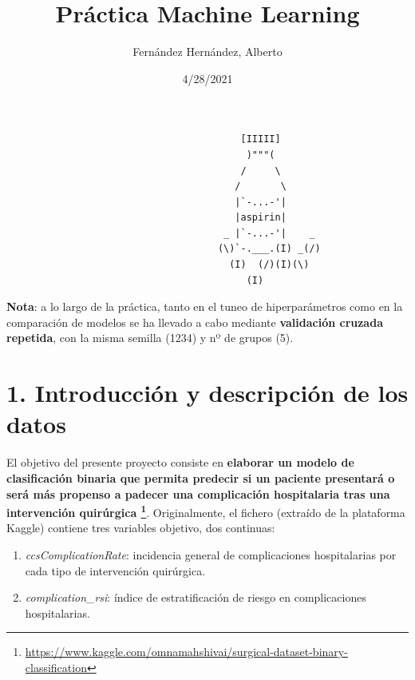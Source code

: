 \documentclass[
]{article}
\title{Práctica Machine Learning}
\author{Fernández Hernández, Alberto}
\date{4/28/2021}
\providecommand{\tightlist}{%
  \setlength{\itemsep}{0pt}\setlength{\parskip}{0pt}}
\begin{document}
\maketitle

\justify

\begin{verbatim}
                                         [IIIII]
                                          )"""(
                                         /     \
                                        /       \
                                        |`-...-'|
                                        |aspirin|
                                      _ |`-...-'|    _
                                     (\)`-.___.(I) _(/)
                                       (I)  (/)(I)(\)
                                          (I)        
\end{verbatim}

\textbf{Nota}: a lo largo de la práctica, tanto en el tuneo de
hiperparámetros como en la comparación de modelos se ha llevado a cabo
mediante \textbf{validación cruzada repetida}, con la misma semilla
(1234) y nº de grupos (5).

\newpage

\hypertarget{introducciuxf3n-y-descripciuxf3n-de-los-datos}{%
\section{1. Introducción y descripción de los
datos}\label{introducciuxf3n-y-descripciuxf3n-de-los-datos}}

El objetivo del presente proyecto consiste en \textbf{elaborar un modelo
de clasificación binaria que permita predecir si un paciente presentará
o será más propenso a padecer una complicación hospitalaria tras una
intervención quirúrgica \footnote{\url{https://www.kaggle.com/omnamahshivai/surgical-dataset-binary-classification}}}.
Originalmente, el fichero (extraído de la plataforma Kaggle) contiene
tres variables objetivo, dos continuas:

\begin{enumerate}
\def\labelenumi{\arabic{enumi}.}
\tightlist
\item
  \emph{ccsComplicationRate}: incidencia general de complicaciones
  hospitalarias por cada tipo de intervención quirúrgica.
\item
  \emph{complication\_rsi}: índice de estratificación de riesgo en
  complicaciones hospitalarias.
\end{enumerate}
\end{document}
